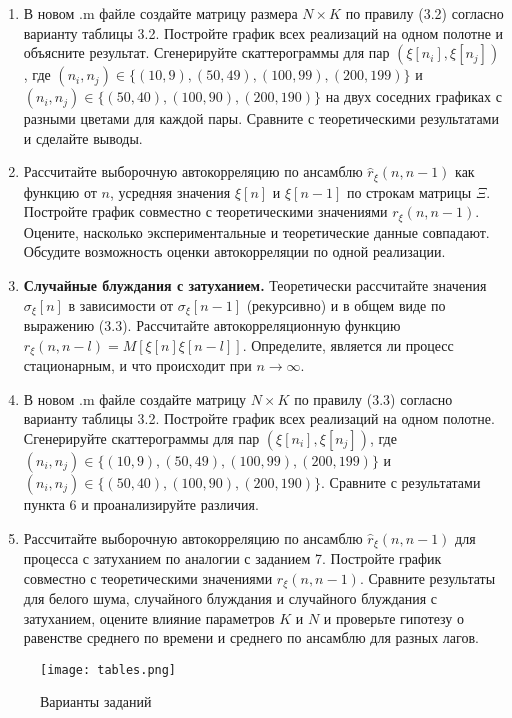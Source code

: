 \begin{enumerate}
    \item В новом .m файле создайте матрицу размера $N \times K$ по правилу (3.2) согласно варианту таблицы 3.2. Постройте график всех реализаций на одном полотне и объясните результат. Сгенерируйте скаттерограммы для пар $(\xi[n_i], \xi[n_j])$, где $(n_i,n_j) \in \{(10,9),(50,49),(100,99),(200,199)\}$ и $(n_i,n_j) \in \{(50,40),(100,90),(200,190)\}$ на двух соседних графиках с разными цветами для каждой пары. Сравните с теоретическими результатами и сделайте выводы.
    
    \item Рассчитайте выборочную автокорреляцию по ансамблю $\hat{r}_\xi(n,n-1)$ как функцию от $n$, усредняя значения $\xi[n]$ и $\xi[n-1]$ по строкам матрицы $\Xi$. Постройте график совместно с теоретическими значениями $r_\xi(n,n-1)$. Оцените, насколько экспериментальные и теоретические данные совпадают. Обсудите возможность оценки автокорреляции по одной реализации.
    
    \item \textbf{Случайные блуждания с затуханием.} Теоретически рассчитайте значения $\sigma_\xi[n]$ в зависимости от $\sigma_\xi[n-1]$ (рекурсивно) и в общем виде по выражению (3.3). Рассчитайте автокорреляционную функцию $r_\xi(n,n-l)=M[\xi[n]\xi[n-l]]$. Определите, является ли процесс стационарным, и что происходит при $n \to \infty$.
    
    \item В новом .m файле создайте матрицу $N \times K$ по правилу (3.3) согласно варианту таблицы 3.2. Постройте график всех реализаций на одном полотне. Сгенерируйте скаттерограммы для пар $(\xi[n_i], \xi[n_j])$, где $(n_i,n_j) \in \{(10,9),(50,49),(100,99),(200,199)\}$ и $(n_i,n_j) \in \{(50,40),(100,90),(200,190)\}$. Сравните с результатами пункта 6 и проанализируйте различия.
    
    \item Рассчитайте выборочную автокорреляцию по ансамблю $\hat{r}_\xi(n,n-1)$ для процесса с затуханием по аналогии с заданием 7. Постройте график совместно с теоретическими значениями $r_\xi(n,n-1)$. Сравните результаты для белого шума, случайного блуждания и случайного блуждания с затуханием, оцените влияние параметров $K$ и $N$ и проверьте гипотезу о равенстве среднего по времени и среднего по ансамблю для разных лагов.
\end{enumerate}


\begin{figure}[H]
    \centering
    \texttt{[image: tables.png]}
    \caption{Варианты заданий}
\end{figure}



\endinput